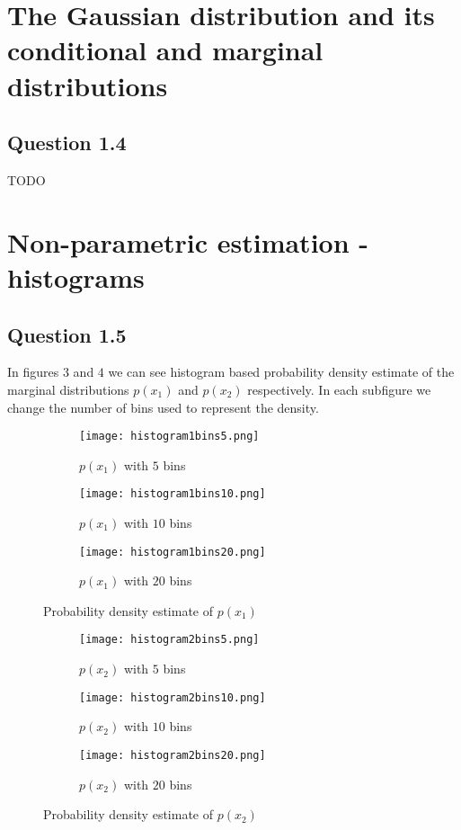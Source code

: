 \documentclass[a4paper,10pt]{article}
\begin{document}
\section{The Gaussian distribution and its conditional and marginal distributions}

\subsection{Question 1.4}

TODO

\section{Non-parametric estimation - histograms}

\subsection*{Question 1.5}

In figures $3$ and $4$ we can see 	histogram based probability density estimate of the marginal distributions $p(x_1)$ and $p(x_2)$ respectively. In each subfigure we change the number of bins used to represent the density.

\begin{figure}[H]
	\centering
	\begin{subfigure}{0.3\textwidth}
  		\centering
  		\texttt{[image: histogram1bins5.png]}
  		\caption{$p(x_1)$ with $5$ bins}
  \end{subfigure}
  \begin{subfigure}{0.3\textwidth}
  		\centering
  		\texttt{[image: histogram1bins10.png]}
  		\caption{$p(x_1)$ with $10$ bins}
  \end{subfigure}
  \begin{subfigure}{0.3\textwidth}
  		\centering
  		\texttt{[image: histogram1bins20.png]}
  		\caption{$p(x_1)$ with $20$ bins}
  \end{subfigure}
  	\caption{Probability density estimate of $p(x_1)$}
\end{figure}

\begin{figure}[H]
	\centering
	\begin{subfigure}{0.3\textwidth}
  		\centering
  		\texttt{[image: histogram2bins5.png]}
  		\caption{$p(x_2)$ with $5$ bins}
  \end{subfigure}
  \begin{subfigure}{0.3\textwidth}
  		\centering
  		\texttt{[image: histogram2bins10.png]}
  		\caption{$p(x_2)$ with $10$ bins}
  \end{subfigure}
  \begin{subfigure}{0.3\textwidth}
  		\centering
  		\texttt{[image: histogram2bins20.png]}
  		\caption{$p(x_2)$ with $20$ bins}
  \end{subfigure}
  	\caption{Probability density estimate of $p(x_2)$}
\end{figure}
\end{document}
